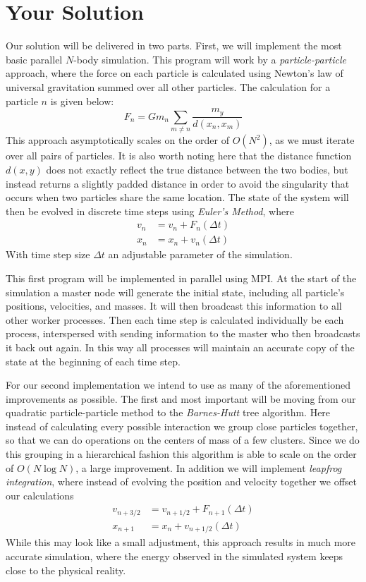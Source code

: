 \documentclass[11pt]{article}
\begin{document}
\section {Your Solution}\label{soln}
Our solution will be delivered in two parts. First, we will implement the most basic parallel $N$-body simulation. This program will work by a \emph{particle-particle} approach, where the force on each particle is calculated using Newton's law of universal gravitation summed over all other particles. The calculation for a particle $n$ is given below:
\[
    F_n = Gm_n\sum_{m \neq n}\frac{m_y}{d(x_n,x_m)}
\]
This approach asymptotically scales on the order of $O(N^2)$, as we must iterate over all pairs of particles. It is also worth noting here that the distance function $d(x,y)$ does not exactly reflect the true distance between the two bodies, but instead returns a slightly padded distance in order to avoid the singularity that occurs when two particles share the same location. The state of the system will then be evolved in discrete time steps using \emph{Euler's Method}, where
\begin{align*}
v_n &= v_n + F_n(\Delta t) \\
x_n &= x_n + v_n(\Delta t)
\end{align*}
With time step size $\Delta t$ an adjustable parameter of the simulation.

This first program will be implemented in parallel using MPI. At the start of the simulation a master node will generate the initial state, including all particle's positions, velocities, and masses. It will then broadcast this information to all other worker processes. Then each time step is calculated individually be each process, interspersed with sending information to the master who then broadcasts it back out again. In this way all processes will maintain an accurate copy of the state at the beginning of each time step.

For our second implementation we intend to use as many of the aforementioned improvements as possible. The first and most important will be moving from our quadratic particle-particle method to the \emph{Barnes-Hutt} tree algorithm. Here instead of calculating every possible interaction we group close particles together, so that we can do operations on the centers of mass of a few clusters. Since we do this grouping in a hierarchical fashion this algorithm is able to scale on the order of $O(N\log N)$, a large improvement. In addition we will implement \emph{leapfrog integration}, where instead of evolving the position and velocity together we offset our calculations
\begin{align*}
v_{n + 3/2} &= v_{n + 1/2} + F_{n+1}(\Delta t) \\
x_{n+1} &= x_n + v_{n+1/2}(\Delta t)
\end{align*}
While this may look like a small adjustment, this approach results in much more accurate simulation, where the energy observed in the simulated system keeps close to the physical reality. 
\end{document}
